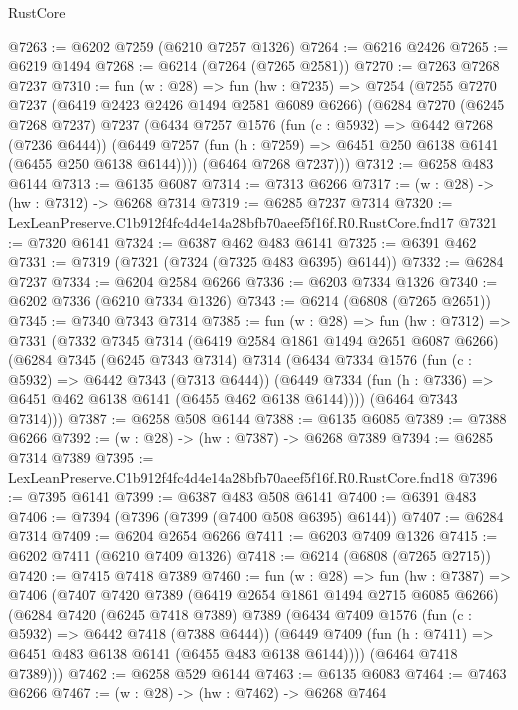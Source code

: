 \begin{lexlean}{RustCore}
\begin{coremodule}
@7263 := @6202 @7259 (@6210 @7257 @1326)
@7264 := @6216 @2426
@7265 := @6219 @1494
@7268 := @6214 (@7264 (@7265 @2581))
@7270 := @7263 @7268 @7237
@7310 := fun (w : @28) =>
  fun (hw : @7235) =>
  @7254
    (@7255
      @7270
      @7237
      (@6419 @2423 @2426 @1494 @2581 @6089 @6266)
      (@6284
        @7270
        (@6245 @7268 @7237)
        @7237
        (@6434
          @7257
          @1576
          (fun (c : @5932) => @6442 @7268 (@7236 @6444))
          (@6449 @7257 (fun (h : @7259) => @6451 @250 @6138 @6141 (@6455 @250 @6138 @6144))))
        (@6464 @7268 @7237)))
@7312 := @6258 @483 @6144
@7313 := @6135 @6087
@7314 := @7313 @6266
@7317 := (w : @28) -> (hw : @7312) -> @6268 @7314
@7319 := @6285 @7237 @7314
@7320 := LexLeanPreserve.C1b912f4fc4d4e14a28bfb70aeef5f16f.R0.RustCore.fnd17
@7321 := @7320 @6141
@7324 := @6387 @462 @483 @6141
@7325 := @6391 @462
@7331 := @7319 (@7321 (@7324 (@7325 @483 @6395) @6144))
@7332 := @6284 @7237
@7334 := @6204 @2584 @6266
@7336 := @6203 @7334 @1326
@7340 := @6202 @7336 (@6210 @7334 @1326)
@7343 := @6214 (@6808 (@7265 @2651))
@7345 := @7340 @7343 @7314
@7385 := fun (w : @28) =>
  fun (hw : @7312) =>
  @7331
    (@7332
      @7345
      @7314
      (@6419 @2584 @1861 @1494 @2651 @6087 @6266)
      (@6284
        @7345
        (@6245 @7343 @7314)
        @7314
        (@6434
          @7334
          @1576
          (fun (c : @5932) => @6442 @7343 (@7313 @6444))
          (@6449 @7334 (fun (h : @7336) => @6451 @462 @6138 @6141 (@6455 @462 @6138 @6144))))
        (@6464 @7343 @7314)))
@7387 := @6258 @508 @6144
@7388 := @6135 @6085
@7389 := @7388 @6266
@7392 := (w : @28) -> (hw : @7387) -> @6268 @7389
@7394 := @6285 @7314 @7389
@7395 := LexLeanPreserve.C1b912f4fc4d4e14a28bfb70aeef5f16f.R0.RustCore.fnd18
@7396 := @7395 @6141
@7399 := @6387 @483 @508 @6141
@7400 := @6391 @483
@7406 := @7394 (@7396 (@7399 (@7400 @508 @6395) @6144))
@7407 := @6284 @7314
@7409 := @6204 @2654 @6266
@7411 := @6203 @7409 @1326
@7415 := @6202 @7411 (@6210 @7409 @1326)
@7418 := @6214 (@6808 (@7265 @2715))
@7420 := @7415 @7418 @7389
@7460 := fun (w : @28) =>
  fun (hw : @7387) =>
  @7406
    (@7407
      @7420
      @7389
      (@6419 @2654 @1861 @1494 @2715 @6085 @6266)
      (@6284
        @7420
        (@6245 @7418 @7389)
        @7389
        (@6434
          @7409
          @1576
          (fun (c : @5932) => @6442 @7418 (@7388 @6444))
          (@6449 @7409 (fun (h : @7411) => @6451 @483 @6138 @6141 (@6455 @483 @6138 @6144))))
        (@6464 @7418 @7389)))
@7462 := @6258 @529 @6144
@7463 := @6135 @6083
@7464 := @7463 @6266
@7467 := (w : @28) -> (hw : @7462) -> @6268 @7464

\end{coremodule}
\end{lexlean}

